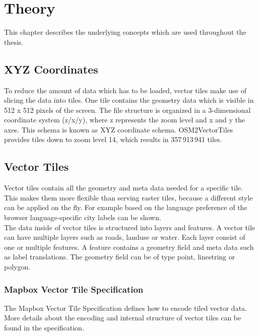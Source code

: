 \chapter{Theory}

This chapter describes the underlying concepts which are used throughout the thesis. 

\section{XYZ Coordinates}\label{part1_xyz_coordinates}

To reduce the amount of data which has to be loaded, vector tiles make use of slicing the data into tiles. One tile contains the geometry data which is visible in 512 x 512 pixels of the screen. The file structure is organized in a 3-dimensional coordinate system (z/x/y), where z represents the zoom level and x and y the axes. This schema is known as XYZ coordinate schema. OSM2VectorTiles provides tiles down to zoom level 14, which results in 357\,913\,941 tiles.

\section{Vector Tiles}\label{part1_vector_tiles}

Vector tiles contain all the geometry and meta data needed for a specific tile. This makes them more flexible than serving raster tiles, because a different style can be applied on the fly. For example based on the language preference of the browser language-specific city labels can be shown.\\
The data inside of vector tiles is structured into layers and features. A vector tile can have multiple layers such as roads, landuse or water. Each layer consist of one or multiple features. A feature contains a geometry field and meta data such as label translations. The geometry field can be of type point, linestring or polygon. 

\subsection{Mapbox Vector Tile Specification}\label{part1_vector_tile_specification}

The Mapbox Vector Tile Specification defines how to encode tiled vector data. More details about the encoding and internal structure of vector tiles can be found in the specification\cite{104_mapbox.com_2016}.

